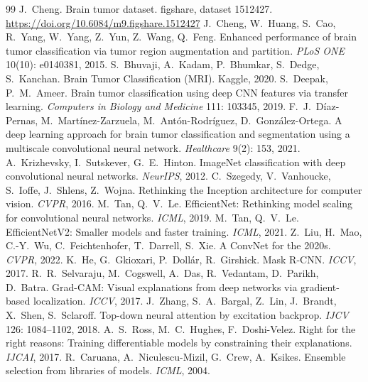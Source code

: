\documentclass[11pt,a4paper]{article}
\begin{document}
\begin{thebibliography}{99}\small
{} J.~Cheng. Brain tumor dataset. figshare, dataset 1512427.
  \url{https://doi.org/10.6084/m9.figshare.1512427}
 J.~Cheng, W.~Huang, S.~Cao, R.~Yang, W.~Yang, Z.~Yun, Z.~Wang, Q.~Feng. Enhanced performance of brain
  tumor classification via tumor region augmentation and partition. \emph{PLoS ONE} 10(10): e0140381, 2015.
 S.~Bhuvaji, A.~Kadam, P.~Bhumkar, S.~Dedge, S.~Kanchan. Brain Tumor Classification (MRI). Kaggle, 2020.
 S.~Deepak, P.~M.~Ameer. Brain tumor classification using deep CNN features via transfer learning.
  \emph{Computers in Biology and Medicine} 111: 103345, 2019.
 F.~J.~Díaz-Pernas, M.~Martínez-Zarzuela, M.~Antón-Rodríguez, D.~González-Ortega. A deep learning
  approach for brain tumor classification and segmentation using a multiscale convolutional neural network.
  \emph{Healthcare} 9(2): 153, 2021.
 A.~Krizhevsky, I.~Sutskever, G.~E.~Hinton. ImageNet classification with deep convolutional neural
  networks. \emph{NeurIPS}, 2012.
 C.~Szegedy, V.~Vanhoucke, S.~Ioffe, J.~Shlens, Z.~Wojna. Rethinking the Inception architecture for
  computer vision. \emph{CVPR}, 2016.
 M.~Tan, Q.~V.~Le. EfficientNet: Rethinking model scaling for convolutional neural networks.
  \emph{ICML}, 2019.
 M.~Tan, Q.~V.~Le. EfficientNetV2: Smaller models and faster training. \emph{ICML}, 2021.
 Z.~Liu, H.~Mao, C.-Y.~Wu, C.~Feichtenhofer, T.~Darrell, S.~Xie. A ConvNet for the 2020s.
  \emph{CVPR}, 2022.
 K.~He, G.~Gkioxari, P.~Dollár, R.~Girshick. Mask R-CNN. \emph{ICCV}, 2017.
 R.~R.~Selvaraju, M.~Cogswell, A.~Das, R.~Vedantam, D.~Parikh, D.~Batra. Grad-CAM: Visual explanations
  from deep networks via gradient-based localization. \emph{ICCV}, 2017.
 J.~Zhang, S.~A.~Bargal, Z.~Lin, J.~Brandt, X.~Shen, S.~Sclaroff. Top-down neural attention by
  excitation backprop. \emph{IJCV} 126: 1084--1102, 2018.
 A.~S.~Ross, M.~C.~Hughes, F.~Doshi-Velez. Right for the right reasons: Training differentiable models
  by constraining their explanations. \emph{IJCAI}, 2017.
 R.~Caruana, A.~Niculescu-Mizil, G.~Crew, A.~Ksikes. Ensemble selection from libraries of models.
  \emph{ICML}, 2004.
\end{thebibliography}
\end{document}
